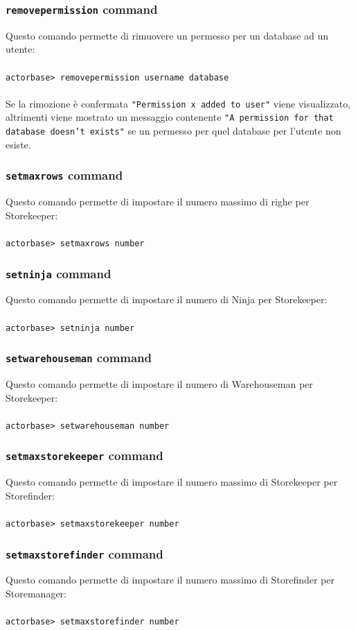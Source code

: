 \documentclass[a4paper]{article}
\begin{document}
	\subsubsection{\texttt{removepermission} command}
	Questo comando permette di rimuovere un permesso per un database ad un utente:
	\\ \\
	\texttt{actorbase>	removepermission username database}
	\\ \\
	Se la rimozione è confermata \texttt{"Permission x added to user"} viene visualizzato, altrimenti viene mostrato un messaggio contenente \texttt{"A permission for that database doesn't exists"} se un permesso per quel database per l'utente non esiste.
	
	\subsubsection{\texttt{setmaxrows} command}
	Questo comando permette di impostare il numero massimo di righe per Storekeeper:
	\\ \\
	\texttt{actorbase>	setmaxrows number}

	\subsubsection{\texttt{setninja} command}
	Questo comando permette di impostare il numero di Ninja per Storekeeper:
	\\ \\
	\texttt{actorbase>	setninja number}
	
	\subsubsection{\texttt{setwarehouseman} command}
	Questo comando permette di impostare il numero di Warehouseman per Storekeeper:
	\\ \\
	\texttt{actorbase>	setwarehouseman number}
	
	\subsubsection{\texttt{setmaxstorekeeper} command}
	Questo comando permette di impostare il numero massimo di Storekeeper per Storefinder:
	\\ \\
	\texttt{actorbase>	setmaxstorekeeper number}

	\subsubsection{\texttt{setmaxstorefinder} command}
	Questo comando permette di impostare il numero massimo di Storefinder per Storemanager:
	\\ \\
	\texttt{actorbase>	setmaxstorefinder number}
			
	\cleardoublepage
	\listoffigures
	
	\cleardoublepage
	\listoftables
		
\end{document}

